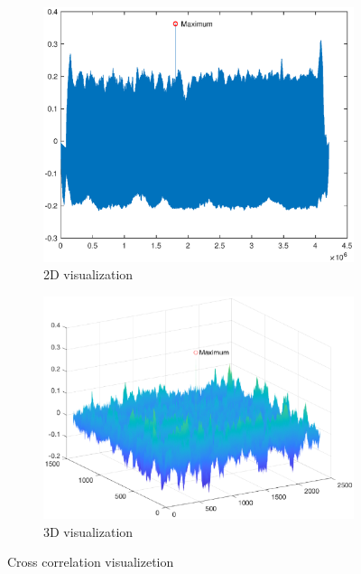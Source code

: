 \begin{figure}[h!]
	\centering
	\begin{subfigure}[t]{0.45\linewidth}
		\includegraphics[width=1\linewidth]{figures/part1/crr_vis1.eps}
		\caption{2D visualization}
		\label{fig:crr_vis1}
	\end{subfigure}
	\begin{subfigure}[t]{0.45\linewidth}
		\centering
		\includegraphics[width=1\linewidth]{figures/part1/crr_vis2.eps}
		\caption{3D visualization}
		\label{fig:crr_vis2}
	\end{subfigure}
	\caption{Cross correlation visualizetion}
\end{figure} 

